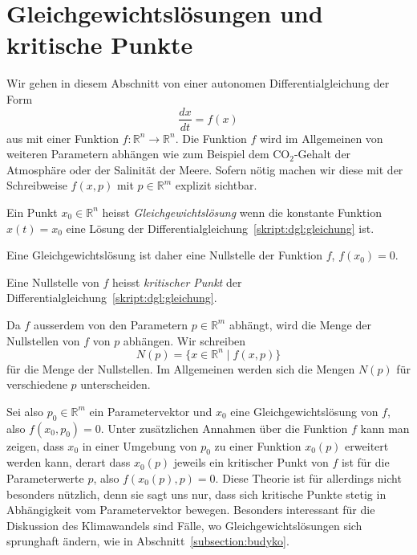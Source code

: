 %
%
%
\section{Gleichgewichtslösungen und kritische Punkte}
Wir gehen in diesem Abschnitt von einer autonomen Differentialgleichung
der Form
\begin{equation}
\frac{dx}{dt} = f(x)
\label{skript:dgl:gleichung}
\end{equation}
aus
mit einer Funktion $f\colon \mathbb R^n \to \mathbb R^n$.
Die Funktion $f$ wird im Allgemeinen von weiteren Parametern abhängen
wie zum Beispiel dem $\text{CO}_2$-Gehalt der Atmosphäre oder der Salinität
der Meere.
Sofern nötig machen wir diese mit der Schreibweise $f(x,p)$ mit
$p\in\mathbb R^m$ explizit sichtbar.

\begin{definition}
Ein Punkt $x_0\in\mathbb R^n$ heisst {\em Gleichgewichtslösung}
wenn die konstante Funktion $x(t)=x_0$ eine Lösung der
Differentialgleichung~\ref{skript:dgl:gleichung} ist.
\end{definition}

Eine Gleichgewichtslösung ist daher eine Nullstelle der Funktion $f$,
$f(x_0)=0$.
\begin{definition}
Eine Nullstelle von $f$ heisst {\em kritischer Punkt} der
Differentialgleichung~\ref{skript:dgl:gleichung}.
\end{definition}

Da $f$ ausserdem von den Parametern $p\in\mathbb R^m$ abhängt,
wird die Menge der Nullstellen von $f$ von $p$ abhängen.
Wir schreiben
\[
N(p) = \{x\in\mathbb R^n\;|\; f(x,p)\}
\]
für die Menge der Nullstellen. 
Im Allgemeinen werden sich die Mengen $N(p)$ für verschiedene $p$ 
unterscheiden.

Sei also $p_0\in\mathbb R^m$ ein Parametervektor und $x_0$ eine
Gleichgewichtslösung von $f$, also $f(x_0,p_0)=0$.
Unter zusätzlichen Annahmen über die Funktion $f$ kann man zeigen,
dass $x_0$ in einer Umgebung von $p_0$ zu einer Funktion
$x_0(p)$ erweitert werden kann, derart dass $x_0(p)$ jeweils ein
kritischer Punkt von $f$ ist für die Parameterwerte $p$, also
$f(x_0(p),p)=0$.
Diese Theorie ist für allerdings nicht besonders nützlich, denn
sie sagt uns nur, dass sich kritische Punkte stetig in Abhängigkeit vom
Parametervektor bewegen.
Besonders interessant für die Diskussion des Klimawandels sind
Fälle, wo Gleichgewichtslösungen sich sprunghaft ändern, wie in
Abschnitt~\ref{subsection:budyko}.

